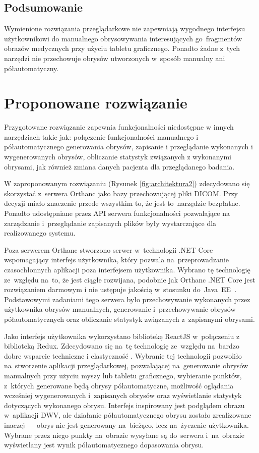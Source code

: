 \documentclass[a4paper,11pt,twoside,openright]{report}
\theoremstyle{definition}
\begin{document}
\subsection {Podsumowanie}

Wymienione rozwiązania przeglądarkowe nie zapewniają wygodnego interfejsu użytkownikowi
do manualnego obrysowywania interesujących go~fragmentów obrazów medycznych przy użyciu tabletu graficznego.
Ponadto żadne z~tych narzędzi nie przechowuje obrysów utworzonych w~sposób manualny
ani półautomatyczny.

\section {Proponowane rozwiązanie}

Przygotowane rozwiązanie zapewnia funkcjonalności niedostępne w innych narzędziach
takie jak: połączenie funkcjonalności manualnego i półautomatycznego generowania obrysów,
zapisanie i przeglądanie wykonanych i wygenerowanych obrysów,
obliczanie statystyk związanych z wykonanymi obrysami, jak również zmiana danych pacjenta
dla przeglądanego badania.

W zaproponowanym rozwiązaniu (Rysunek \ref{fig:architektura2}) zdecydowano się skorzystać z~serwera Orthanc jako bazy przechowującej
pliki DICOM. Przy decyzji miało znaczenie przede wszystkim to, że jest to~narzędzie
bezpłatne. Ponadto udostępniane przez API serwera funkcjonalności pozwalające na
zarządzanie i~przeglądanie zapisanych plików były wystarczające dla realizowanego systemu.

Poza serwerem Orthanc stworzono serwer w~technologii .NET Core \cite{Dotnet}
wspomagający interfejs użytkownika, który pozwala na~przeprowadzanie czasochłonnych
aplikacji poza interfejsem użytkownika. Wybrano tę technologię ze~względu na~to,
że jest ciągle rozwijana, podobnie jak Orthanc .NET Core jest rozwiązaniem darmowym
i nie ustępuje jakością w~stosunku do~Java~EE~\cite{Dlaczego dotnet}.
Podstawowymi zadaniami tego serwera było przechowywanie
wykonanych przez użytkownika obrysów manualnych, generowanie i~przechowywanie
obrysów półautomatycznych oraz obliczanie statystyk związanych z~zapisanymi obrysami.

Jako interfejs użytkownika wykorzystano bibliotekę ReactJS \cite{React} w~połączeniu
z biblioteką Redux\cite{Redux}. Zdecydowano się na~tę technologię ze~względu na~bardzo dobre wsparcie techniczne
i elastyczność \cite{Dlaczego react}. Wybranie tej technologii pozwoliło na~stworzenie
aplikacji przeglądarkowej, pozwalającej na~generowanie obrysów manualnych przy
użyciu myszy lub tabletu graficznego, wybieranie punktów, z~których generowane
będą obrysy półautomatyczne, możliwość oglądania wcześniej wygenerowanych i~zapisanych
obrysów oraz wyświetlanie statystyk dotyczących wykonanego obrysu. Interfejs
inspirowany jest podglądem obrazu w~aplikacji DWV, ale działanie półautomatycznego
obrysu zostało zrealizowane inaczej --- obrys nie jest generowany na~bieżąco, lecz na~życzenie
użytkownika. Wybrane przez niego punkty na~obrazie wysyłane są do~serwera i~na~obrazie wyświetlany jest
wynik półautomatycznego dopasowania obrysu.
\end{document}
